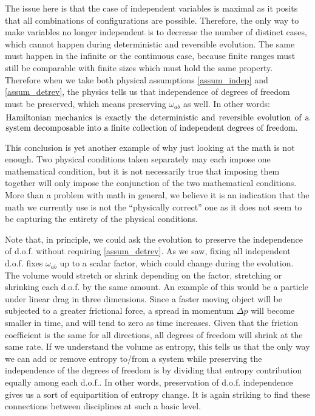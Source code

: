 The issue here is that the case of independent variables is maximal as it posits that all combinations of configurations are possible. Therefore, the only way to make variables no longer independent is to decrease the number of distinct cases, which cannot happen during deterministic and reversible evolution. The same must happen in the infinite or the continuous case, because finite ranges must still be comparable with finite sizes which must hold the same property. Therefore when we take both physical assumptions \ref{assum_indep} and \ref{assum_detrev}, the physics tells us that independence of degrees of freedom must be preserved, which means preserving $\omega_{ab}$ as well. In other words:
\begin{equation}
	\parbox{5in}{Hamiltonian mechanics is exactly the deterministic and reversible evolution of a system decomposable into a finite collection of independent degrees of freedom.}
\end{equation} 

This conclusion is yet another example of why just looking at the math is not enough. Two physical conditions taken separately may each impose one mathematical condition, but it is not necessarily true that imposing them together will only impose the conjunction of the two mathematical conditions. More than a problem with math in general, we believe it is an indication that the math we currently use is not the ``physically correct'' one as it does not seem to be capturing the entirety of the physical conditions. 

Note that, in principle, we could ask the evolution to preserve the independence of d.o.f. without requiring \ref{assum_detrev}. As we saw, fixing all independent d.o.f. fixes $\omega_{ab}$ up to a scalar factor, which could change during the evolution. The volume would stretch or shrink depending on the factor, stretching or shrinking each d.o.f. by the same amount. An example of this would be a particle under linear drag in three dimensions. Since a faster moving object will be subjected to a greater frictional force, a spread in momentum $\Delta p$ will become smaller in time, and will tend to zero as time increases. Given that the friction coefficient is the same for all directions, all degrees of freedom will shrink at the same rate. If we understand the volume as entropy, this tells us that the only way we can add or remove entropy to/from a system while preserving the independence of the degrees of freedom is by dividing that entropy contribution equally among each d.o.f.. In other words, preservation of d.o.f. independence gives us a sort of equipartition of entropy change. It is again striking to find these connections between disciplines at such a basic level.

